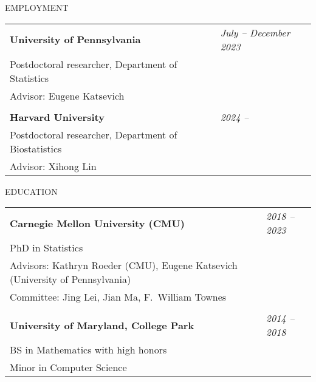 \documentclass{resume} %
\begin{document}
\begin{rSection}{EMPLOYMENT}
	
	\begin{tabular}{p{12.5cm}R{4.0cm}}
		\bf{University of Pennsylvania}  &  \it{July -- December 2023} \\ Postdoctoral researcher, Department of Statistics & \\
		Advisor: Eugene Katsevich & \\ & \\
		\textbf{Harvard University} & \textit{2024 --} \\
		Postdoctoral researcher, Department of Biostatistics  & \\
		Advisor: Xihong Lin
	\end{tabular} 
	
\end{rSection}

\begin{rSection}{EDUCATION}

\begin{tabular}{p{14cm}R{2.5cm}}
	\bf{Carnegie Mellon University (CMU)}  &  \it{2018 -- 2023}  \\ 
	PhD in Statistics &  \\ Advisors: Kathryn Roeder (CMU), Eugene Katsevich (University of Pennsylvania) & \\ Committee: Jing Lei, Jian Ma, F.\ William Townes  &\\ &\\
	\textbf{University of Maryland, College Park} & \it{2014 -- 2018}
	 \\  BS in Mathematics with high honors & \\
	 Minor in Computer Science
\end{tabular} 

\end{rSection}




\end{document}
